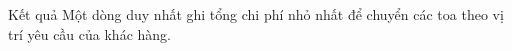 Kết quả
Một dòng duy nhất ghi tổng chi phí nhỏ nhất để chuyển các toa theo vị trí yêu cầu của khác hàng.